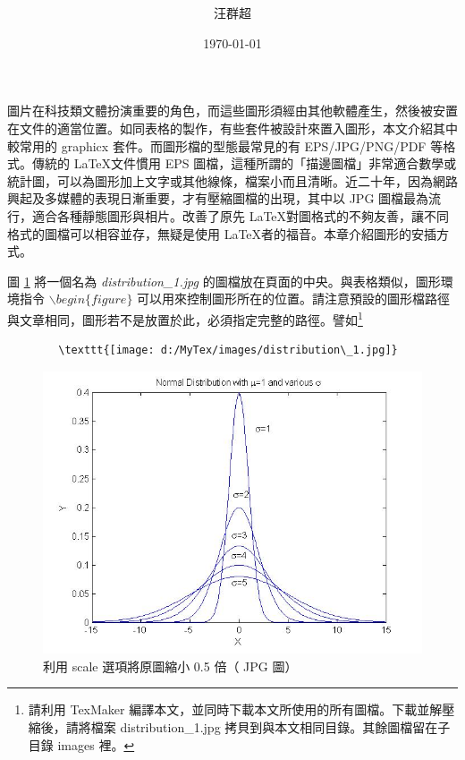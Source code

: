 \documentclass[12pt, a4paper]{article}
\title{ \XeLaTeX {\MB 外製圖形的引入}}
\author{{\SM 汪群超}}
\date{{\TT \today}}
\begin{document}
\maketitle
\fontsize{12}{22pt}\selectfont
圖片在科技類文體扮演重要的角色，而這些圖形須經由其他軟體產生，然後被安置在文件的適當位置。如同表格的製作，有些套件被設計來置入圖形，本文介紹其中較常用的 graphicx 套件。而圖形檔的型態最常見的有 EPS/JPG/PNG/PDF 等格式。傳統的 \LaTeX 文件慣用 EPS 圖檔，這種所謂的「描邊圖檔」非常適合數學或統計圖，可以為圖形加上文字或其他線條，檔案小而且清晰。近二十年，因為網路興起及多媒體的表現日漸重要，才有壓縮圖檔的出現，其中以 JPG 圖檔最為流行，適合各種靜態圖形與相片。\XeLaTeX 改善了原先 \LaTeX 對圖格式的不夠友善，讓不同格式的圖檔可以相容並存，無疑是使用 \LaTeX 者的福音。本章介紹圖形的安插方式。

圖 \ref{fig:scale} 將一個名為  \textit{distribution\_1.jpg} 的圖檔放在頁面的中央。與表格類似，圖形環境指令 $\backslash begin\{figure\}$ 可以用來控制圖形所在的位置。請注意預設的圖形檔路徑與文章相同，圖形若不是放置於此，必須指定完整的路徑。譬如\footnote{請利用  TexMaker 編譯本文，並同時下載本文所使用的所有圖檔。下載並解壓縮後，請將檔案  distribution\_1.jpg 拷貝到與本文相同目錄。其餘圖檔留在子目錄  images 裡。}

\bigskip
	\begin{lstlisting}
		\texttt{[image: d:/MyTex/images/distribution\_1.jpg]}
	\end{lstlisting}
\bigskip

\begin{figure}[h]
    \centering
        \includegraphics[scale=0.5]{distribution_1.jpg}
    \caption{利用 scale 選項將原圖縮小 0.5 倍（ JPG 圖）}
    \label{fig:scale}
\end{figure}
\end{document}
